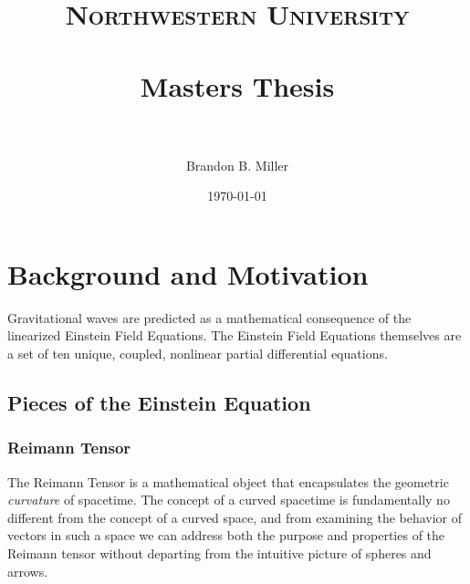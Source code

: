 \documentclass[paper=a4, fontsize=11pt]{scrartcl} %
\title{	
\normalfont \normalsize 
\textsc{Northwestern University} \\ [25pt] %
\horrule{0.5pt} \\[0.4cm] %
\huge Masters Thesis \\ %
\horrule{2pt} \\[0.5cm] %
}
\author{Brandon B. Miller} %
\date{\normalsize\today} %
\numberwithin{equation}{section} %
\numberwithin{figure}{section} %
\numberwithin{table}{section} %
\begin{document}
\maketitle %

\section{Background and Motivation}

Gravitational waves are predicted as a mathematical consequence of the linearized Einstein Field Equations. The Einstein Field Equations themselves are a set of ten unique, coupled, nonlinear partial differential equations.  

\subsection{Pieces of the Einstein Equation}
\subsubsection{Reimann Tensor}
The Reimann Tensor is a mathematical object that encapsulates the geometric \textit{curvature} of spacetime. The concept of a curved spacetime is fundamentally no different from the concept of a curved space, and from examining the behavior of vectors in such a space we can address both the purpose and properties of the Reimann tensor without departing from the intuitive picture of spheres and arrows.
\end{document}
